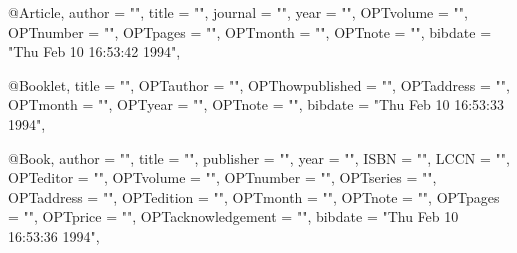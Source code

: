 

@Article{,
  author =       "",
  title =        "",
  journal =      "",
  year =         "",
  OPTvolume =    "",
  OPTnumber =    "",
  OPTpages =     "",
  OPTmonth =     "",
  OPTnote =      "",
  bibdate =      "Thu Feb 10 16:53:42 1994",
}

@Booklet{,
  title =        "",
  OPTauthor =    "",
  OPThowpublished = "",
  OPTaddress =   "",
  OPTmonth =     "",
  OPTyear =      "",
  OPTnote =      "",
  bibdate =      "Thu Feb 10 16:53:33 1994",
}

@Book{,
  author =       "",
  title =        "",
  publisher =    "",
  year =         "",
  ISBN =         "",
  LCCN =         "",
  OPTeditor =    "",
  OPTvolume =    "",
  OPTnumber =    "",
  OPTseries =    "",
  OPTaddress =   "",
  OPTedition =   "",
  OPTmonth =     "",
  OPTnote =      "",
  OPTpages =     "",
  OPTprice =     "",
  OPTacknowledgement = "",
  bibdate =      "Thu Feb 10 16:53:36 1994",
}

